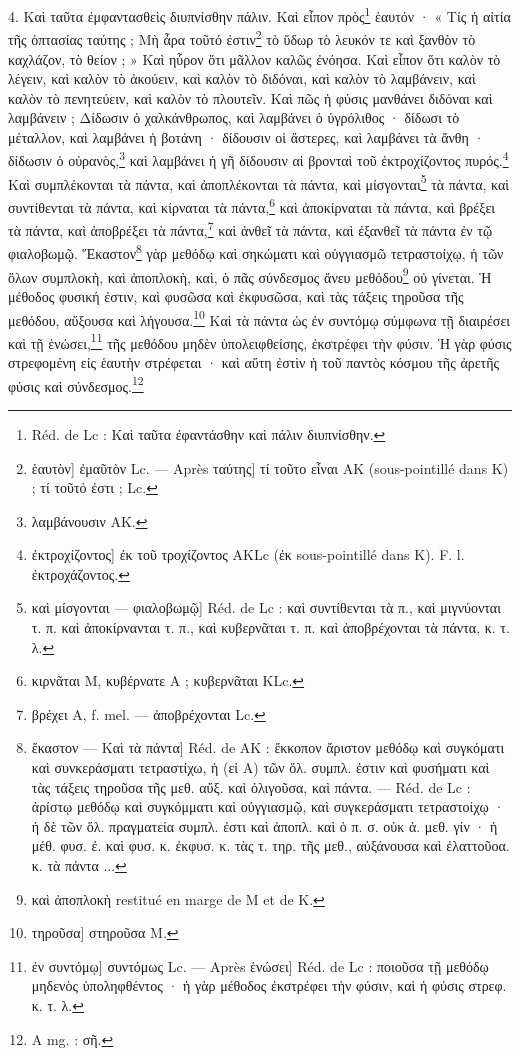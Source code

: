 \documentclass[landscape, a4paper, 11pt, oneside, polutonikogreek, french]{article}
\begin{document}
4. Καὶ ταῦτα ἐμφαντασθεὶς διυπνίσθην πάλιν. Καὶ εἶπον πρὸς\footnote{Réd. de Lc : Καὶ ταῦτα ἐφαντάσθην καὶ πάλιν διυπνίσθην.} ἑαυτόν · « Τίς ἡ αἰτία τῆς ὀπτασίας ταύτης ; Μὴ ἆρα τοῦτό ἐστιν\footnote{ἑαυτὸν] ἐμαῦτὸν Lc. --- Après ταύτης] τί τοῦτο εἶναι AK (sous-pointillé dans Κ) ; τί τοῦτό ἐστι ; Lc.} τὸ ὕδωρ τὸ λευκόν τε καὶ ξανθὸν τὸ καχλάζον, τὸ θείον ; » Καὶ ηὗρον ὅτι μᾶλλον καλῶς ἐνόησα. Καὶ εἶπον ὅτι καλὸν τὸ λέγειν, καὶ καλὸν τὸ ἀκούειν, καὶ καλὸν τὸ διδόναι, καὶ καλὸν τὸ λαμβάνειν, καὶ καλὸν τὸ πενητεύειν, καὶ καλὸν τὸ πλουτεῖν. Καὶ πῶς ἡ φύσις μανθάνει διδόναι καὶ λαμβάνειν ; Δίδωσιν ὁ χαλκάνθρωπος, καὶ λαμβάνει ὁ ὑγρόλιθος · δίδωσι τὸ μέταλλον, καὶ λαμβάνει ἡ βοτάνη · δίδουσιν οἱ ἄστερες, καὶ λαμβάνει τὰ ἄνθη · δίδωσιν ὁ οὐρανὸς,\footnote{λαμβάνουσιν AK.} καὶ λαμβάνει ἡ γῆ δίδουσιν αἱ βρονταὶ τοῦ ἐκτροχίζοντος πυρός.\footnote{ἐκτροχίζοντος] ἐκ τοῦ τροχίζοντος AKLc (ἐκ sous-pointillé dans K). F. l. ἐκτροχάζοντος.} Καὶ συμπλέκονται τὰ πάντα, καὶ ἀποπλέκονται τὰ πάντα, καὶ μίσγονται\footnote{καὶ μίσγονται --- φιαλοβωμῷ] Réd. de Lc : καὶ συντίθενται τὰ π., καὶ μιγνύονται τ. π. καὶ ἀποκίρνανται τ. π., καὶ κυβερνᾶται τ. π. καὶ ἀποβρέχονται τὰ πάντα, κ. τ. λ.} τὰ πάντα, καὶ συντίθενται τὰ πάντα, καὶ κίρναται τὰ πάντα,\footnote{κιρνᾶται M, κυβέρνατε A ; κυβερνᾶται KLc.} καὶ ἀποκίρναται τὰ πάντα, καὶ βρέξει τὰ πάντα, καὶ ἀποβρέξει τὰ πάντα,\footnote{βρέχει A, f. mel. --- ἀποβρέχονται Lc.} καὶ ἀνθεῖ τὰ πάντα, καὶ ἐξανθεῖ τὰ πάντα ἐν τῷ φιαλοβωμῷ. Ἕκαστον\footnote{ἕκαστον --- Καὶ τὰ πάντα] Réd. de AΚ : ἔκκοπον ἄριστον μεθόδῳ καὶ συγκόματι καὶ συνκεράσματι τετραστίχω, ἡ (εἰ A) τῶν ὅλ. συμπλ. ἐστιν καὶ φυσήματι καὶ τὰς τάξεις τηροῦσα τῆς μεθ. αὔξ. καὶ ὀλιγοῦσα, καὶ πάντα. --- Réd. de Lc : ἀρίστῳ μεθόδῳ καὶ συγκόμματι καὶ οὐγγιασμῷ, καὶ συγκεράσματι τετραστοίχῳ · ἡ δὲ τῶν ὅλ. πραγματεία συμπλ. ἐστι καὶ ἀποπλ. καὶ ὁ π. σ. οὐκ ἀ. μεθ. γίν · ἡ μέθ. φυσ. ἐ. καὶ φυσ. κ. ἐκφυσ. κ. τὰς τ. τηρ. τῆς μεθ., αὐξάνουσα καὶ ἐλαττοῦοα. κ. τὰ πάντα ...} γὰρ μεθόδῳ καὶ σηκώματι καὶ οὐγγιασμῶ τετραστοίχῳ, ἡ τῶν ὅλων συμπλοκὴ, καὶ ἀποπλοκὴ, καὶ, ὁ πᾶς σύνδεσμος ἄνευ μεθόδου\footnote{καὶ ἀποπλοκὴ restitué en marge de M et de K.} οὐ γίνεται. Ἡ μέθοδος φυσική ἐστιν, καὶ φυσῶσα καὶ ἐκφυσῶσα, καὶ τὰς τάξεις τηροῦσα τῆς μεθόδου, αὔξουσα καὶ λήγουσα.\footnote{τηροῦσα] στηροῦσα M.} Καὶ τὰ πάντα ὡς ἐν συντόμῳ σύμφωνα τῇ διαιρέσει καὶ τῇ ἑνώσει,\footnote{ἐν συντόμῳ] συντόμως Lc. --- Après ἑνώσει] Réd. de Lc : ποιοῦσα τῇ μεθόδῳ μηδενὸς ὑποληφθέντος · ἡ γὰρ μέθοδος ἐκστρέφει τὴν φύσιν, καὶ ἡ φύσις στρεφ. κ. τ. λ.} τῆς μεθόδου μηδὲν ὑπολειφθείσης, ἐκστρέφει τὴν φύσιν. Ἡ γὰρ φύσις στρεφομένη εἰς ἑαυτὴν στρέφεται · καὶ αὕτη ἐστὶν ἡ τοῦ παντὸς κόσμου τῆς ἀρετῆς φύσις καὶ σύνδεσμος.\footnote{A mg. : σῆ.}
\end{document}
